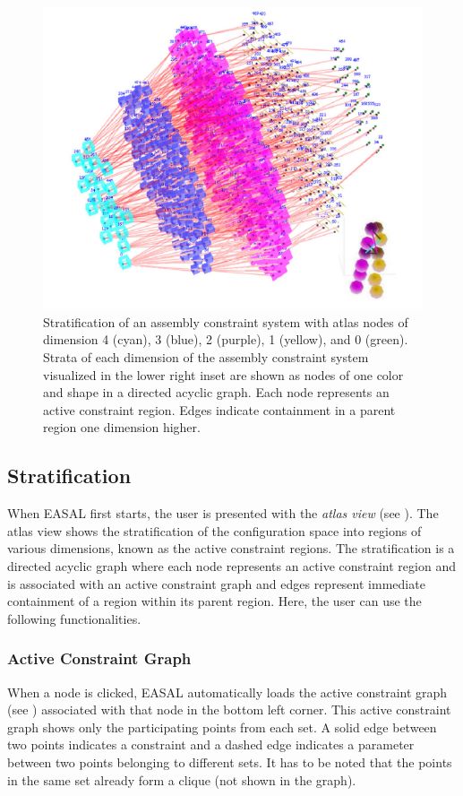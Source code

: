 \documentclass[10pt]{article}
\begin{document}
\begin{figure}
\begin{center}
\includegraphics[width=.6\linewidth]{fig/Stratification.png}
\end{center}
\caption{Stratification of an assembly constraint system with atlas nodes of
    dimension 4 (cyan), 3 (blue), 2 (purple), 1 (yellow), and 0 (green). Strata of
	each dimension of the assembly constraint system visualized in the
	lower right inset are shown as nodes of one color and shape in a
	directed acyclic graph. Each node represents an active constraint
region. Edges indicate containment in a parent region one dimension higher.}
\label{atlas}
\end{figure}


\subsection{Stratification}
When EASAL first starts, the user is presented with the \emph{atlas view} (see
). The atlas view shows the stratification of the
configuration space into regions of various dimensions, known as the active
constraint regions. The stratification is a directed acyclic graph where each
node represents an active constraint region and is associated with an active
constraint graph and edges represent immediate containment of a region within
its parent region.  Here, the user can use the following functionalities. 

\subsubsection{Active Constraint Graph} 
When a node is clicked, EASAL automatically loads the active constraint graph
(see ) associated with that node in the bottom left corner.
This active constraint graph shows only the participating points from each set.
A solid edge between two points indicates a constraint and a dashed edge
indicates a parameter between two points belonging to different sets. It has to
be noted that the points in the same set already form a clique (not shown in
the graph).
\end{document}
